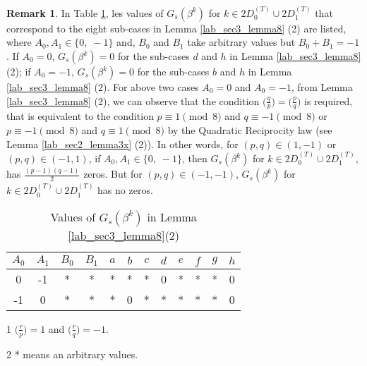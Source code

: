 \documentclass{mcom-l}
\theoremstyle{definition}
\newtheorem{sec3_remark3}[sec3_remark1]{Remark}
\numberwithin{equation}{section}
\begin{document}
     \begin{sec3_remark3}\label{Lab_sec3_remark3_A_thm2}
     In Table \ref{Lab_Table3_lemma8_2case2}, les values of $ G_{s}(\beta^{k}) $ for $ k\in 2D_{0}^{(T)}\cup 2D_{1}^{(T)} $ that correspond to the eight sub-cases in Lemma \ref{lab_sec3_lemma8} (2) are listed, where $ A_{0}, A_{1}\in \lbrace 0,\;-1\rbrace $ and,  $ B_{0} $ and $ B_{1} $ take arbitrary values but $ B_{0} + B_{1}=-1$. If $ A_{0}=0 $, $ G_{s}(\beta^{k})=0 $ for the sub-cases $ d $ and $ h $ in Lemma \ref{lab_sec3_lemma8} (2); if $ A_{0}=-1 $, $ G_{s}(\beta^{k})=0 $ for the sub-cases $ b $ and $ h $ in Lemma \ref{lab_sec3_lemma8} (2). For above two cases $ A_{0}=0 $ and $ A_{0}=-1 $, from Lemma \ref{lab_sec3_lemma8} (2), we can observe that the condition $ \bigl(\tfrac{q}{p}\bigr) =\bigl(\tfrac{p}{q}\bigr) $ is required, that is equivalent to the condition $ p\equiv 1\pmod 8 $ and $ q\equiv -1\pmod 8 $ or $ p\equiv -1\pmod 8 $ and $ q\equiv 1\pmod 8 $ by the Quadratic Reciprocity law (see Lemma \ref{lab_sec2_lemma3x} (2)). In other words, for $ (p,q)\in (1,-1) $ or $ (p,q)\in (-1,1) $, if $ A_{0}, A_{1}\in \lbrace 0,\;-1\rbrace $, then $ G_{s}(\beta^{k}) $ for $ k\in 2D_{0}^{(T)}\cup 2D_{1}^{(T)} $, has $ \tfrac{(p-1)(q-1)}{2} $ zeros. But for $ (p,q)\in (-1,-1) $, $ G_{s}(\beta^{k}) $ for $ k\in 2D_{0}^{(T)}\cup 2D_{1}^{(T)} $ has no zeros.
     \end{sec3_remark3}
      \begin{table}[!t]
      \begin{threeparttable}[t]
        \renewcommand{\arraystretch}{1.3}
        \caption{Values of $ G_{s}(\beta^{k})$ in Lemma \ref{lab_sec3_lemma8}(2)
        \label{Lab_Table3_lemma8_2case2}}
        \centering
        \begin{tabular}{c|c|c|c|c|c|c|c|c|c|c|c}
        \hline
       $ A_{0} $ & $ A_{1} $ & $ B_{0} $ & $ B_{1} $ & $ a $ & $ b $ & $ c $ & $ d $ & $ e $ & $ f $ & $ g $ & $ h $\\
        \hline
        0 & -1 & *\tnote{2} & * & * & * & * & 0 & * & * & * & 0\\
        \hline
        -1 & 0 & * & * & * &  0 & * & * & * & * & * & 0\\
        \hline
        \end{tabular}
         \begin{tablenotes}
              \item [1] $ \bigl(\tfrac{r}{p}\bigr) =1 $ and $ \bigl(\tfrac{r}{q}\bigr) =-1 $.
              \item [2] * means an arbitrary values.
             
              \end{tablenotes}
        \end{threeparttable}
        \end{table}
\end{document}

